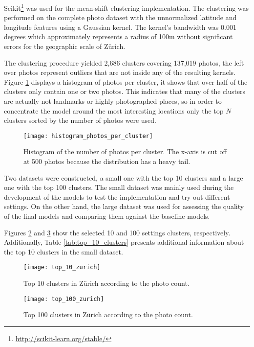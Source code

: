 Scikit\footnote{\url{http://scikit-learn.org/stable/}} was used for the mean-shift clustering implementation. The clustering was performed on the complete photo dataset with the unnormalized latitude and longitude features using a Gaussian kernel. The kernel's bandwidth was 0.001 degrees which approximately represents a radius of 100m without significant errors for the geographic scale of Zürich.

The clustering procedure yielded 2,686 clusters covering 137,019 photos, the left over photos represent outliers that are not inside any of the resulting kernels. Figure \ref{fig:photos_per_clusters} displays a histogram of photos per cluster, it shows that over half of the clusters only contain one or two photos. This indicates that many of the clusters are actually not landmarks or highly photographed places, so in order to concentrate the model around the most interesting locations only the top $N$ clusters sorted by the number of photos were used.

\begin{figure}
  \centering
  \texttt{[image: histogram\_photos\_per\_cluster]}
  \caption{Histogram of the number of photos per cluster. The x-axis is cut off at 500 photos because the distribution has a heavy tail.}
  \label{fig:photos_per_clusters}
\end{figure}

Two datasets were constructed, a small one with the top 10 clusters and a large one with the top 100 clusters. The small dataset was mainly used during the development of the models to test the implementation and try out different settings. On the other hand, the large dataset was used for assessing the quality of the final models and comparing them against the baseline models.

Figures \ref{fig:top_10_zurich} and \ref{fig:top_100_zurich} show the selected 10 and 100 settings clusters, respectively. Additionally, Table \ref{tab:top_10_clusters} presents additional information about the top 10 clusters in the small dataset.

\begin{figure}
  \centering
  \texttt{[image: top\_10\_zurich]}
  \caption{Top 10 clusters in Zürich according to the photo count.}
  \label{fig:top_10_zurich}
\end{figure}

\begin{figure}
  \centering
  \texttt{[image: top\_100\_zurich]}
  \caption{Top 100 clusters in Zürich according to the photo count.}
  \label{fig:top_100_zurich}
\end{figure}


